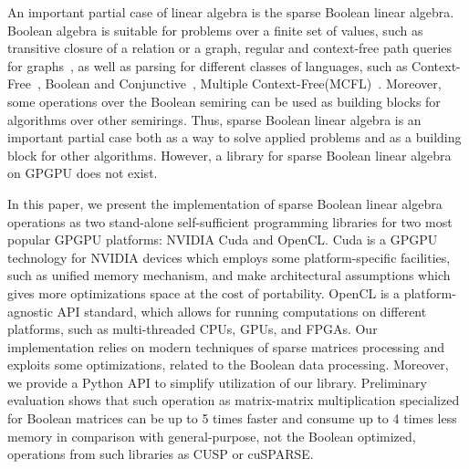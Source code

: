 An important partial case of linear algebra is the sparse Boolean linear algebra.
Boolean algebra is suitable for problems over a finite set of values, such as transitive closure of a relation or a graph, regular and context-free path queries for graphs~\cite{10.1145/3210259.3210264}, as well as parsing for different classes of languages, such as Context-Free~\cite{10.1016/S0022-0000(75)80046-8}, Boolean and Conjunctive~\cite{OKHOTIN2014101}, Multiple Context-Free(MCFL)~\cite{10.5555/972525.972527}.
Moreover, some operations over the Boolean semiring can be used as building blocks for algorithms over other semirings.
Thus, sparse Boolean linear algebra is an important partial case both as a way to solve applied problems and as a building block for other algorithms.
However, a library for sparse Boolean linear algebra on GPGPU does not exist.

In this paper, we present the implementation of sparse Boolean linear algebra operations as two stand-alone self-sufficient programming libraries for two most popular GPGPU platforms: NVIDIA Cuda
 and OpenCL. %
Cuda is a GPGPU technology for NVIDIA devices which employs some platform-specific facilities, such as unified memory mechanism, and make architectural assumptions which gives more optimizations space at the cost of portability.
OpenCL is a platform-agnostic API standard, which allows for running computations on different platforms, such as multi-threaded CPUs, GPUs, and FPGAs.
Our implementation relies on modern techniques of sparse matrices processing and exploits some optimizations, related to the Boolean data processing.
Moreover, we provide a Python API to simplify utilization of our library.
Preliminary evaluation shows that such operation as matrix-matrix multiplication specialized for Boolean matrices can be up to 5 times faster and consume up to 4 times less memory in comparison with general-purpose, not the Boolean optimized, operations from such libraries as CUSP or cuSPARSE.